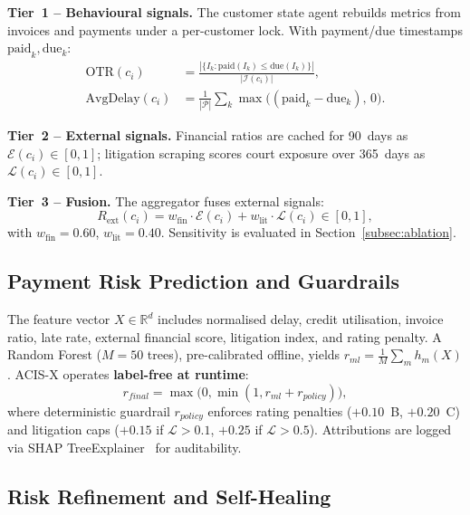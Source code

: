 \documentclass[pdflatex,sn-mathphys-num]{sn-jnl}
\theoremstyle{thmstyleone}
\theoremstyle{thmstyletwo}
\theoremstyle{thmstylethree}
\begin{document}
\textbf{Tier~1 -- Behavioural signals.} The customer state agent rebuilds metrics from invoices and payments under a per-customer lock. With payment/due timestamps $\mathrm{paid}_k, \mathrm{due}_k$:
\begin{equation}
\begin{split}
\mathrm{OTR}(c_i) &= \frac{|\{I_k : \mathrm{paid}(I_k)\leq\mathrm{due}(I_k)\}|}{|\mathcal{I}(c_i)|}, \\
\mathrm{AvgDelay}(c_i) &= \frac{1}{|\mathcal{P}|}\sum_{k}\max\bigl((\mathrm{paid}_k - \mathrm{due}_k),\,0\bigr).
\end{split}
\label{eq:behavioural}
\end{equation}

\textbf{Tier~2 -- External signals.} Financial ratios are cached for 90~days as $\mathcal{E}(c_i)\in[0,1]$; litigation scraping scores court exposure over 365~days as $\mathcal{L}(c_i)\in[0,1]$.

\textbf{Tier~3 -- Fusion.} The aggregator fuses external signals:
\begin{equation}
R_{\text{ext}}(c_i) = w_{\text{fin}}\cdot\mathcal{E}(c_i) + w_{\text{lit}}\cdot\mathcal{L}(c_i)\in[0,1],
\label{eq:aggregation}
\end{equation}
with $w_{\text{fin}}{=}0.60$, $w_{\text{lit}}{=}0.40$. Sensitivity is evaluated in Section~\ref{subsec:ablation}.

\subsection{Payment Risk Prediction and Guardrails}\label{subsec:prediction}

The feature vector $X\in\mathbb{R}^{d}$ includes normalised delay, credit utilisation, invoice ratio, late rate, external financial score, litigation index, and rating penalty. A Random Forest ($M{=}50$ trees), pre-calibrated offline, yields $r_{ml}=\frac{1}{M}\sum_{m} h_m(X)$. ACIS-X operates \textbf{label-free at runtime}:
\begin{equation}
r_{final}=\max\bigl(0,\min(1,r_{ml}+r_{policy})\bigr),
\label{eq:prediction}
\end{equation}
where deterministic guardrail $r_{policy}$ enforces rating penalties ($+0.10$~B, $+0.20$~C) and litigation caps ($+0.15$ if $\mathcal{L}{>}0.1$, $+0.25$ if $\mathcal{L}{>}0.5$). Attributions are logged via SHAP TreeExplainer~\cite{lundberg2020local} for auditability.

\subsection{Risk Refinement and Self-Healing}\label{subsec:refinement}
\end{document}
